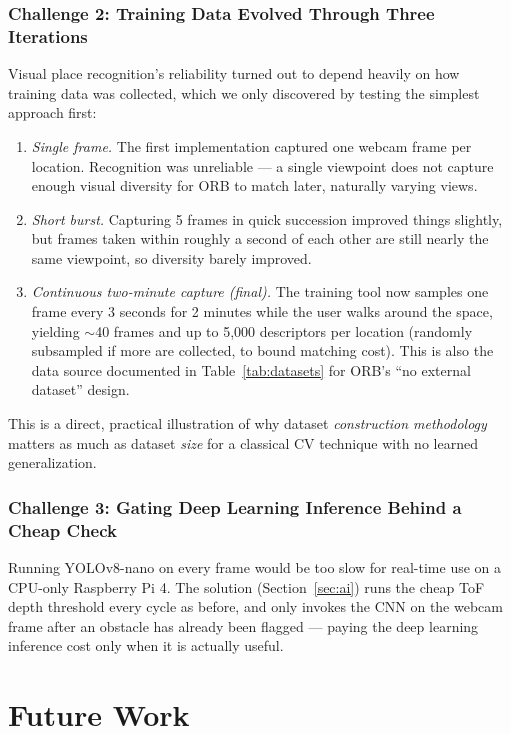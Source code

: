 \documentclass[12pt,a4paper]{article}
\begin{document}
\subsubsection{Challenge 2: Training Data Evolved Through Three Iterations}
Visual place recognition's reliability turned out to depend heavily on how training data was collected, which we only discovered by testing the simplest approach first:
\begin{enumerate}[leftmargin=1.4cm]
  \item \textit{Single frame.} The first implementation captured one webcam frame per location. Recognition was unreliable — a single viewpoint does not capture enough visual diversity for ORB to match later, naturally varying views.
  \item \textit{Short burst.} Capturing 5 frames in quick succession improved things slightly, but frames taken within roughly a second of each other are still nearly the same viewpoint, so diversity barely improved.
  \item \textit{Continuous two-minute capture (final).} The training tool now samples one frame every 3 seconds for 2 minutes while the user walks around the space, yielding $\sim$40 frames and up to 5{,}000 descriptors per location (randomly subsampled if more are collected, to bound matching cost). This is also the data source documented in Table~\ref{tab:datasets} for ORB's ``no external dataset'' design.
\end{enumerate}
This is a direct, practical illustration of why dataset \emph{construction methodology} matters as much as dataset \emph{size} for a classical CV technique with no learned generalization.

\subsubsection{Challenge 3: Gating Deep Learning Inference Behind a Cheap Check}
Running YOLOv8-nano on every frame would be too slow for real-time use on a CPU-only Raspberry Pi 4. The solution (Section~\ref{sec:ai}) runs the cheap ToF depth threshold every cycle as before, and only invokes the CNN on the webcam frame after an obstacle has already been flagged — paying the deep learning inference cost only when it is actually useful.

\section{Future Work}
\label{sec:future}
\end{document}
